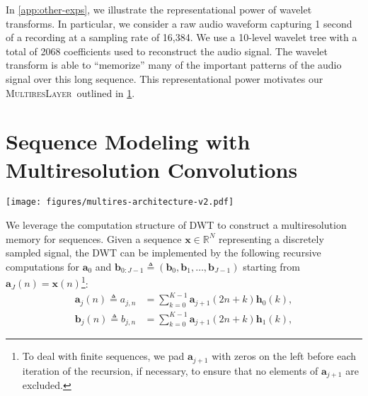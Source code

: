 \documentclass{article}
\newcommand{\reals}{\mathbb{R}}
\theoremstyle{plain}
\theoremstyle{definition}
\theoremstyle{remark}
\newcommand{\ourlayer}{\textsc{MultiresLayer}}
\newcommand{\treeblock}{\textsc{MultiresBlock}}
\newcommand{\ourconv}{\textsc{MultiresConv}}
\begin{document}
In \cref{app:other-exps}, 
we illustrate the representational power of wavelet transforms.  In particular, we consider a raw audio waveform capturing 1 second of a recording at a sampling rate of 16,384.  We use a 10-level wavelet tree with a total of 2068 coefficients used to reconstruct the audio signal.  The wavelet transform is able to ``memorize'' many of the important patterns of the audio signal over this long sequence.  This representational power motivates our \ourlayer\ outlined in \cref{sec:multiresnet}.




\section{Sequence Modeling with Multiresolution Convolutions}
\label{sec:multiresnet}
\begin{figure*}[t]
\texttt{[image: figures/multires-architecture-v2.pdf]}
\centering
\vspace{-4mm}
\caption{(Left) \ourconv\ consists of a sequence of dilated convolutions that share the same filters $\mathbf h_0, \mathbf h_1$ across all levels. Here we illustrate \textsc{TreeSelect} with the ``resolution fading'' strategy of keeping the right-most coefficient at each level of $\mathbf{a}_0, \mathbf{b}_{0:J-1}$, 
as indicated by magenta outlines. 
(Right) A schematic of our \treeblock\ architecture. Each channel of the input sequence is processed independently in the \ourlayer. 
The 1x1 convolution mixes the information across channels. 
We stack multiple \treeblock s\  to build our deep sequence models.} \vspace{-4mm}
\label{fig:multires-architecture}
\end{figure*}
We leverage the computation structure of DWT to construct a multiresolution memory for sequences. 
Given a sequence $\mathbf x \in \reals^{N}$ representing a discretely sampled signal, the DWT can be implemented by the following recursive computations for $\mathbf a_0$ and $\mathbf b_{0:J-1} \triangleq (\mathbf b_0, \mathbf b_1, \ldots, \mathbf b_{J-1}) $ starting from $\mathbf a_{J}(n) = \mathbf x(n)$\footnote{To deal with finite sequences, we pad $\mathbf{a}_{j+1}$ with zeros on the left before each iteration of the recursion, if necessary, to ensure that no elements of $\mathbf{a}_{j+1}$ are excluded. }:
\begin{align*}
\mathbf a_{j}(n) \triangleq a_{j,n} &= \sum_{k=0}^{K - 1} \mathbf a_{j+1}(2n + k) \mathbf h_0(k), \\
\mathbf b_{j}(n) \triangleq b_{j,n} &= \sum_{k=0}^{K - 1} \mathbf a_{j+1}(2n + k) \mathbf h_1(k), 
\end{align*}
\end{document}
